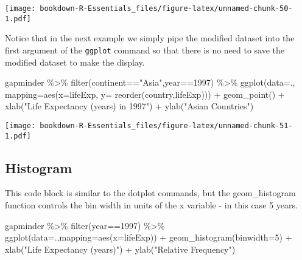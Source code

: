 \documentclass[
]{book}
\newenvironment{Shaded}{\begin{snugshade}}{\end{snugshade}}
\newcommand{\AttributeTok}[1]{\textcolor[rgb]{0.77,0.63,0.00}{#1}}
\newcommand{\DecValTok}[1]{\textcolor[rgb]{0.00,0.00,0.81}{#1}}
\newcommand{\FunctionTok}[1]{\textcolor[rgb]{0.00,0.00,0.00}{#1}}
\newcommand{\NormalTok}[1]{#1}
\newcommand{\SpecialCharTok}[1]{\textcolor[rgb]{0.00,0.00,0.00}{#1}}
\newcommand{\StringTok}[1]{\textcolor[rgb]{0.31,0.60,0.02}{#1}}
\begin{document}
\texttt{[image: bookdown-R-Essentials\_files/figure-latex/unnamed-chunk-50-1.pdf]}

Notice that in the next example we simply pipe the modified dataset into the first argument of the \texttt{ggplot} command so that there is no need to save the modified dataset to make the display.

\begin{Shaded}
\begin{Highlighting}[]
\NormalTok{gapminder }\SpecialCharTok{\%\textgreater{}\%} \FunctionTok{filter}\NormalTok{(continent}\SpecialCharTok{==}\StringTok{"Asia"}\NormalTok{,year}\SpecialCharTok{==}\DecValTok{1997}\NormalTok{) }\SpecialCharTok{\%\textgreater{}\%}
\FunctionTok{ggplot}\NormalTok{(}\AttributeTok{data=}\NormalTok{., }\AttributeTok{mapping=}\FunctionTok{aes}\NormalTok{(}\AttributeTok{x=}\NormalTok{lifeExp, }\AttributeTok{y=} \FunctionTok{reorder}\NormalTok{(country,lifeExp))) }\SpecialCharTok{+} 
  \FunctionTok{geom\_point}\NormalTok{() }\SpecialCharTok{+} 
  \FunctionTok{xlab}\NormalTok{(}\StringTok{"Life Expectancy (years) in 1997"}\NormalTok{) }\SpecialCharTok{+} 
  \FunctionTok{ylab}\NormalTok{(}\StringTok{"Asian Countries"}\NormalTok{)}
\end{Highlighting}
\end{Shaded}

\texttt{[image: bookdown-R-Essentials\_files/figure-latex/unnamed-chunk-51-1.pdf]}

\hypertarget{histogram}{%
\subsection{Histogram}\label{histogram}}

This code block is similar to the dotplot commands, but the geom\_histogram function controls the bin width in units of the x variable - in this case 5 years.

\begin{Shaded}
\begin{Highlighting}[]
\NormalTok{gapminder }\SpecialCharTok{\%\textgreater{}\%} \FunctionTok{filter}\NormalTok{(year}\SpecialCharTok{==}\DecValTok{1997}\NormalTok{) }\SpecialCharTok{\%\textgreater{}\%}
\FunctionTok{ggplot}\NormalTok{(}\AttributeTok{data=}\NormalTok{.,}\AttributeTok{mapping=}\FunctionTok{aes}\NormalTok{(}\AttributeTok{x=}\NormalTok{lifeExp)) }\SpecialCharTok{+} 
  \FunctionTok{geom\_histogram}\NormalTok{(}\AttributeTok{binwidth=}\DecValTok{5}\NormalTok{) }\SpecialCharTok{+} 
  \FunctionTok{xlab}\NormalTok{(}\StringTok{"Life Expectancy (years)"}\NormalTok{) }\SpecialCharTok{+}
  \FunctionTok{ylab}\NormalTok{(}\StringTok{"Relative Frequency"}\NormalTok{)}
\end{Highlighting}
\end{Shaded}
\end{document}

